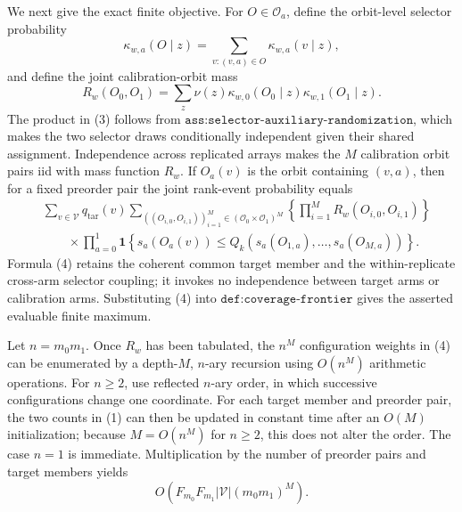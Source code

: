 We next give the exact finite objective. For \(O\in\mathcal O_a\), define the orbit-level selector probability
\[\kappa_{w,a}(O\mid z)=\sum_{v:(v,a)\in O}\kappa_{w,a}(v\mid z),\]
and define the joint calibration-orbit mass
\[R_w(O_0,O_1)=\sum_z\nu(z)\kappa_{w,0}(O_0\mid z)\kappa_{w,1}(O_1\mid z).\tag{3}\]
The product in (3) follows from \(\texttt{ass:selector-auxiliary-randomization}\), which makes the two selector draws conditionally independent given their shared assignment. Independence across replicated arrays makes the \(M\) calibration orbit pairs iid with mass function \(R_w\). If \(O_a(v)\) is the orbit containing \((v,a)\), then for a fixed preorder pair the joint rank-event probability equals
\[\begin{aligned}&\sum_{v\in\mathcal V}q_{\mathrm{tar}}(v)\!\sum_{((O_{i,0},O_{i,1}))_{i=1}^M\in(\mathcal O_0\times\mathcal O_1)^M}\!\left\{\prod_{i=1}^M R_w(O_{i,0},O_{i,1})\right\}\\&\qquad\times\prod_{a=0}^1\mathbf 1\!\left\{s_a(O_a(v))\le Q_k(s_a(O_{1,a}),\ldots,s_a(O_{M,a}))\right\}.\end{aligned}\tag{4}\]
Formula (4) retains the coherent common target member and the within-replicate cross-arm selector coupling; it invokes no independence between target arms or calibration arms. Substituting (4) into \(\texttt{def:coverage-frontier}\) gives the asserted evaluable finite maximum.

Let \(n=m_0m_1\). Once \(R_w\) has been tabulated, the \(n^M\) configuration weights in (4) can be enumerated by a depth-\(M\), \(n\)-ary recursion using \(O(n^M)\) arithmetic operations. For \(n\ge2\), use reflected \(n\)-ary order, in which successive configurations change one coordinate. For each target member and preorder pair, the two counts in (1) can then be updated in constant time after an \(O(M)\) initialization; because \(M=O(n^M)\) for \(n\ge2\), this does not alter the order. The case \(n=1\) is immediate. Multiplication by the number of preorder pairs and target members yields
\[O\!\left(F_{m_0}F_{m_1}|\mathcal V|(m_0m_1)^M\right).\tag{5}\]

